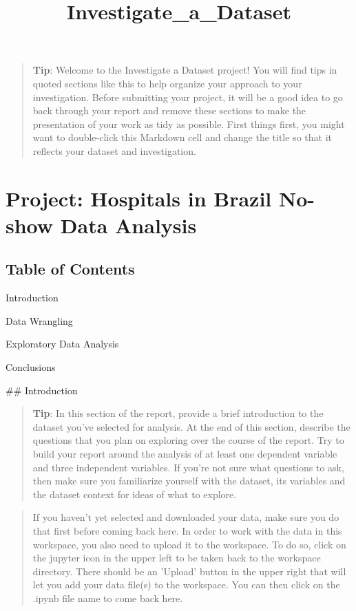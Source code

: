 \documentclass[11pt]{article}
\title{Investigate\_a\_Dataset}
\begin{document}
    
    
    \maketitle
    
    

    
    \begin{quote}
\textbf{Tip}: Welcome to the Investigate a Dataset project! You will
find tips in quoted sections like this to help organize your approach to
your investigation. Before submitting your project, it will be a good
idea to go back through your report and remove these sections to make
the presentation of your work as tidy as possible. First things first,
you might want to double-click this Markdown cell and change the title
so that it reflects your dataset and investigation.
\end{quote}

\section{Project: Hospitals in Brazil No-show Data
Analysis}\label{project-hospitals-in-brazil-no-show-data-analysis}

\subsection{Table of Contents}\label{table-of-contents}

Introduction

Data Wrangling

Exploratory Data Analysis

Conclusions

     \#\# Introduction

\begin{quote}
\textbf{Tip}: In this section of the report, provide a brief
introduction to the dataset you've selected for analysis. At the end of
this section, describe the questions that you plan on exploring over the
course of the report. Try to build your report around the analysis of at
least one dependent variable and three independent variables. If you're
not sure what questions to ask, then make sure you familiarize yourself
with the dataset, its variables and the dataset context for ideas of
what to explore.
\end{quote}

\begin{quote}
If you haven't yet selected and downloaded your data, make sure you do
that first before coming back here. In order to work with the data in
this workspace, you also need to upload it to the workspace. To do so,
click on the jupyter icon in the upper left to be taken back to the
workspace directory. There should be an 'Upload' button in the upper
right that will let you add your data file(s) to the workspace. You can
then click on the .ipynb file name to come back here.
\end{quote}
\end{document}
